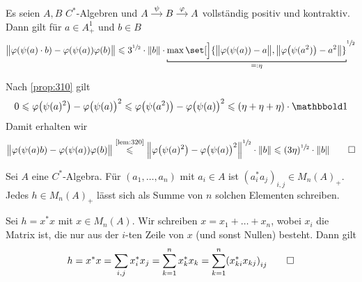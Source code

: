 \begin{lemma}
	Es seien $A,B$ $C^*$-Algebren und $\begin{tikzcd}[cramped,sep=small] A \rar["\psi"] & B \rar["\varphi"] & A \end{tikzcd}$ vollständig positiv und kontraktiv.
	Dann gilt für $a \in A^1_+$ und $b \in B$
	\[
		\norm[\big]{\varphi \enbrace*{\psi(a) \cdot b} - \varphi \enbrace*{\psi(a)} \varphi(b)} \le 3^{\sfrac{1}{2}} \cdot  \norm*{b} \cdot \Underbracket{\max \set[\Big]{\norm[\big]{\varphi \enbrace*{\psi(a)}-a}, \norm*{\varphi \enbrace*{\psi(a^2)} -a^2}}}{=: \eta}^{\sfrac{1}{2}}
	\]
\end{lemma}
\begin{beweis}
	Nach \autoref{prop:310} gilt
	\[
		0 \le \varphi \enbrace*{\psi(a)^2} - \varphi \enbrace[\big]{\psi(a)}^2 \le \varphi \enbrace*{\psi(a^2)} - \varphi \enbrace[\big]{\psi(a)}^2 \le (\eta + \eta +\eta) \cdot \ind
	\]
	Damit erhalten wir
	\[
		\norm[\big]{\varphi \enbrace*{\psi(a)b} - \varphi \enbrace*{\psi(a)} \varphi(b)} \StackText{\ref{lem:320}}{\le} \norm*{\varphi \enbrace*{\psi(a)^2} - \varphi \enbrace[\big]{\psi(a)}^2}^{\sfrac{1}{2}} \cdot \norm*{b} \le (3 \eta)^{\sfrac{1}{2}} \cdot \norm*{b} \qedhere
	\]
\end{beweis}

\begin{proposition}
	Sei $A$ eine $C^*$-Algebra.
	Für $(a_1,\ldots ,a_n)$ mit $a_i \in A$ ist $(a_i^* a_j)_{i,j} \in M_n(A)_+$.
	Jedes $h \in M_n(A)_+$ lässt sich als Summe von $n$ solchen Elementen schreiben.
\end{proposition}
\begin{beweis}
	Sei $h=x^*x$ mit $x \in M_n(A)$.
	Wir schreiben $x = x_1 + \ldots + x_n$, wobei $x_i$ die Matrix ist, die nur aus der $i$-ten Zeile von $x$ (und sonst Nullen) besteht.
	Dann gilt
	\[
		h = x^* x = \sum_{i,j} x_i^* x_j = \sum_{k=1}^{n} x_k^* x_k = \sum_{k=1}^{n} \enbrace*{x_{ki}^* x_{kj}}_{ij} \qedhere
	\]
\end{beweis}

